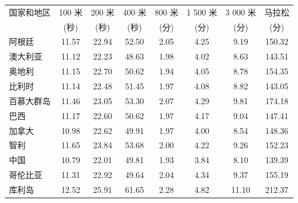 \begin{mvtable}
\label{tab:1.9}
\begin{tabular}{lccccccc}
\toprule
国家和地区 & 100 米 & 200 米 & 400 米 & 800 米 & 1 500 米 & 3 000 米 & 马拉松 \\
 & (秒) & (秒) & (秒) & (分) & (分) & (分) & (分) \\
\midrule
阿根廷 & 11.57 & 22.94 & 52.50 & 2.05 & 4.25 & 9.19 & 150.32 \\
澳大利亚 & 11.12 & 22.23 & 48.63 & 1.98 & 4.02 & 8.63 & 143.51 \\
奥地利 & 11.15 & 22.70 & 50.62 & 1.94 & 4.05 & 8.78 & 154.35 \\
比利时 & 11.14 & 22.48 & 51.45 & 1.97 & 4.08 & 8.82 & 143.05 \\
百慕大群岛 & 11.46 & 23.05 & 53.30 & 2.07 & 4.29 & 9.81 & 174.18 \\
巴西 & 11.17 & 22.60 & 50.62 & 1.97 & 4.17 & 9.04 & 147.41 \\
加拿大 & 10.98 & 22.62 & 49.91 & 1.97 & 4.00 & 8.54 & 148.36 \\
智利 & 11.65 & 23.84 & 53.68 & 2.00 & 4.22 & 9.26 & 152.23 \\
中国 & 10.79 & 22.01 & 49.81 & 1.93 & 3.84 & 8.10 & 139.39 \\
哥伦比亚 & 11.31 & 22.92 & 49.64 & 2.04 & 4.34 & 9.37 & 155.19 \\
库利岛 & 12.52 & 25.91 & 61.65 & 2.28 & 4.82 & 11.10 & 212.37 \\
\bottomrule
\end{tabular}
\end{mvtable}
